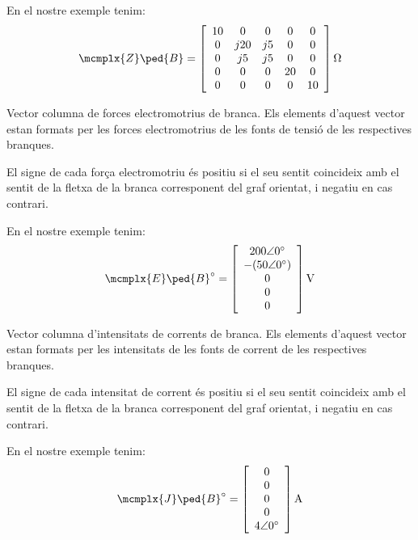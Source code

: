 \begin{list}{}
   En el nostre exemple tenim:
   \[
      \mcmplx{Z}\ped{B} = 
      \begin{bmatrix}\begin{array}{ccccc} 
            10 & 0 & 0 & 0 & 0 \\
            0 & j 20 & j 5 & 0 & 0 \\
            0 & j 5 & j 5 & 0 & 0 \\
            0 & 0 & 0 & 20 & 0 \\
            0 & 0 & 0 & 0 & 10
      \end{array}\end{bmatrix}\unit{\ohm}
   \]

   \item[$\mcmplx{E}\ped{B}^\circ\{b\}$]  Vector columna de forces electromotrius de branca. Els elements d'aquest vector estan formats per les forces electromotrius de les fonts de tensió de les respectives branques.

El signe de cada força electromotriu és positiu si el seu sentit coincideix amb el sentit de la fletxa de la branca corresponent del graf orientat, i negatiu en cas contrari.

   En el nostre exemple tenim:
   \[
      \mcmplx{E}\ped{B}^\circ = 
      \begin{bmatrix}\begin{array}{c}  
      	\complexnum{200:0} \\ -(\complexnum{50:0}) \\ 0 \\ 0 \\ 0 
      \end{array}\end{bmatrix}\unit{V}
   \]

\item[$\mcmplx{J}\ped{B}^\circ\{b\}$] Vector columna d'intensitats de corrents de branca. Els elements d'aquest vector estan formats per les intensitats de les fonts de corrent de les respectives branques.

El signe de cada intensitat de corrent és positiu si el seu sentit coincideix amb el sentit de la fletxa de la branca corresponent del graf orientat, i negatiu en cas contrari.

   En el nostre exemple tenim:
   \[
      \mcmplx{J}\ped{B}^\circ = 
      \begin{bmatrix}\begin{array}{c}  
      	0 \\ 0 \\ 0 \\ 0 \\ \complexnum{4:0} 
      \end{array}\end{bmatrix}\unit{A}
   \]

\end{list}


